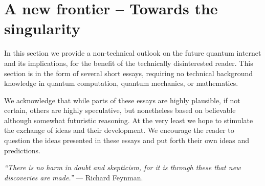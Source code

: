 %
%

\section{A new frontier -- Towards the singularity} \label{sec:outlook}  

In this section we provide a non-technical outlook on the future quantum internet and its implications, for the benefit of the technically disinterested reader. This section is in the form of several short essays, requiring no technical background knowledge in quantum computation, quantum mechanics, or mathematics.

We acknowledge that while parts of these essays are highly plausible, if not certain, others are highly speculative, but nonetheless based on believable although somewhat futuristic reasoning. At the very least we hope to stimulate the exchange of ideas and their development. We encourage the reader to question the ideas presented in these essays and put forth their own ideas and predictions.

\textit{``There is no harm in doubt and skepticism, for it is through these that new discoveries are made.''} --- Richard Feynman.

%
%



%
%



%
%



%
%



%
%



%
%



%
%



%
%

